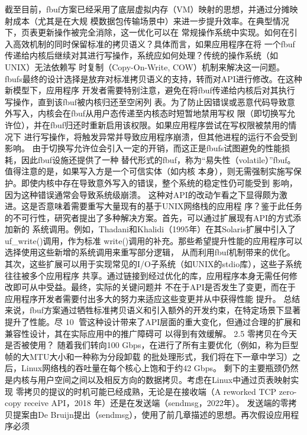 截至目前，fbuf方案已经采用了底层虚拟内存（VM）映射的思想，并通过分摊映射成本（尤其是在大规
模数据包传输场景中）来进一步提升效率。在典型情况下，页表更新操作被完全消除，这一优化可以在
常规操作系统中实现。如何在引入高效机制的同时保留标准的拷贝语义？具体而言，如果应用程序在将
一个fbuf传递给内核后继续对其进行写操作，系统应如何处理？传统的操作系统（如UNIX）无法依赖写
时复制（Copy-On-Write, COW）机制来解决这一问题。
fbufs最终的设计选择是放弃对标准拷贝语义的支持，转而对API进行修改。在这种新模型下，应用程序
开发者需要特别注意，避免在将fbuf传递给内核后对其执行写操作，直到该fbuf被内核归还至空闲列
表。为了防止因错误或恶意代码导致意外写入，内核会在fbuf从用户态传递至内核态时短暂地禁用写权
限（即切换写允许位），并在fbuf归还时重新启用该权限。如果应用程序尝试在写权限被禁用的情况下
进行写操作，将触发异常并导致应用程序崩溃，但其他进程的运行不会受到影响。
由于切换写允许位会引入一定的开销，而这正是fbufs试图避免的性能损耗，因此fbuf设施还提供了一种
替代形式的fbuf，称为“易失性（volatile）”fbuf。值得注意的是，如果写入方是一个可信实体（如内核
本身），则无需强制实施写保护。即使内核中存在导致意外写入的错误，整个系统的稳定性仍可能受到
影响，因为这种错误通常会导致系统级崩溃。
这种对API的改动乍看之下显得颇为激进。这是否意味着需要重写大量现有的基于UNIX网络栈的应用程
序？鉴于此任务的不可行性，研究者提出了多种解决方案。首先，可以通过扩展现有API的方式添加新的
系统调用。例如，Thadani和Khalidi（1995年）在其Solaris扩展中引入了uf_write()调用，作为标准
write()调用的补充。那些希望提升性能的应用程序可以选择使用这些新增的系统调用来重写部分逻辑，
从而利用fbuf机制带来的优化。
其次，这些扩展可以用于实现常见的I/O子系统（如UNIX的stdio库），这些子系统往往被多个应用程序
共享。通过链接到经过优化的库，应用程序本身无需任何修改即可从中受益。最终，实际的关键问题并
不在于API是否发生了变更，而在于应用程序开发者需要付出多大的努力来适应这些变更并从中获得性能
提升。
总结来说，fbuf方案通过牺牲标准拷贝语义和引入额外的开发约束，在特定场景下显著提升了性能。尽
                                                                                                10
管这种设计带来了API层面的重大变化，但通过合理的扩展和兼容性设计，其在实际应用中的推广障碍可
以得到有效缓解。
2.5 零拷贝在今天是否被使用？
随着我们转向100 Gbps，在进行了所有主要优化（例如，称为巨型帧的大MTU大小和一种称为分段卸载
的批处理形式，我们将在下一章中学习）之后，Linux网络栈的吞吐量在每个核心上饱和于约42 Gbps。
剩下的主要瓶颈仍然是内核与用户空间之间以及相反方向的数据拷贝。考虑在Linux中通过页表映射实现
零拷贝的提议的时机可能已经成熟，无论是在接收端（A reworked TCP zero-copy receive API，2018
年）还是在发送端（sendmsg，2022年）。
发送端的零拷贝提案由De Bruijn提出（sendmsg），使用了前几章描述的思想。再次假设应用程序必须
